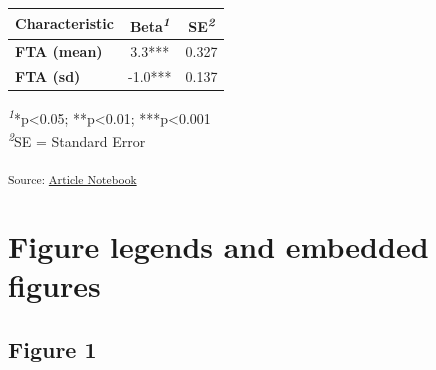 \documentclass[
]{agujournal2019}
\begin{document}
\setlength{\LTpost}{0mm}
\begin{longtable*}{lcc}
\toprule
\textbf{Characteristic} & \textbf{Beta}\textsuperscript{\textit{1}} & \textbf{SE}\textsuperscript{\textit{2}} \\ 
\midrule\addlinespace[2.5pt]
\textbf{FTA (mean)} & 3.3*** & 0.327 \\ 
\textbf{FTA (sd)} & -1.0*** & 0.137 \\ 
\bottomrule
\end{longtable*}
\begin{minipage}{\linewidth}
\textsuperscript{\textit{1}}*p\textless{}0.05; **p\textless{}0.01; ***p\textless{}0.001\\
\textsuperscript{\textit{2}}SE = Standard Error\\
\end{minipage}

\textsubscript{Source:
\href{https://lessardlab.github.io/FTA-Neotropics/index.qmd.html}{Article
Notebook}}

\section{Figure legends and embedded
figures}\label{figure-legends-and-embedded-figures}

\subsection{Figure 1}\label{figure-1}
\end{document}

